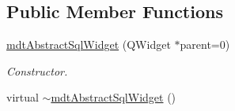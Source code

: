 \subsection*{Public Member Functions}
\begin{DoxyCompactItemize}
\item 
\hyperlink{classmdt_abstract_sql_widget_a74ef509a9487c3985fce7a4cbadbe1b3}{mdtAbstractSqlWidget} (QWidget $\ast$parent=0)
\begin{DoxyCompactList}\small\item\em Constructor. \end{DoxyCompactList}\item 
\hypertarget{classmdt_abstract_sql_widget_a46dabe9e76aaea93ff20b28863e6c0ff}{
virtual \hyperlink{classmdt_abstract_sql_widget_a46dabe9e76aaea93ff20b28863e6c0ff}{$\sim$mdtAbstractSqlWidget} ()}
\label{classmdt_abstract_sql_widget_a46dabe9e76aaea93ff20b28863e6c0ff}


\end{DoxyCompactItemize}
